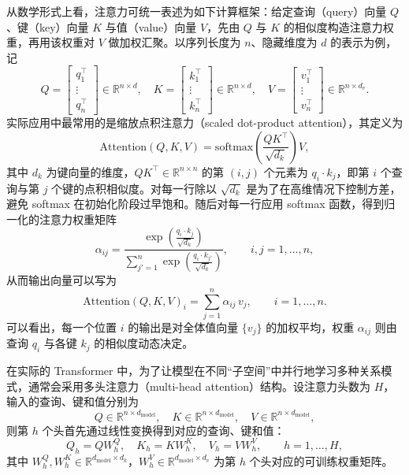 从数学形式上看，注意力可统一表述为如下计算框架：给定查询（query）向量 $Q$、键（key）向量 $K$ 与值（value）向量 $V$，先由 $Q$ 与 $K$ 的相似度构造注意力权重，再用该权重对 $V$ 做加权汇聚。以序列长度为 $n$、隐藏维度为 $d$ 的表示为例，记
\[
    Q = \begin{bmatrix} q_1^\top \\ \vdots \\ q_n^\top \end{bmatrix} \in \mathbb{R}^{n \times d},\quad
    K = \begin{bmatrix} k_1^\top \\ \vdots \\ k_n^\top \end{bmatrix} \in \mathbb{R}^{n \times d},\quad
    V = \begin{bmatrix} v_1^\top \\ \vdots \\ v_n^\top \end{bmatrix} \in \mathbb{R}^{n \times d_v}.
\]
实际应用中最常用的是缩放点积注意力（scaled dot-product attention），其定义为
\begin{equation}
    \mathrm{Attention}(Q,K,V)
    = \mathrm{softmax}\!\left( \frac{QK^\top}{\sqrt{d_k}} \right) V,
\end{equation}
其中 $d_k$ 为键向量的维度，$QK^\top \in \mathbb{R}^{n \times n}$ 的第 $(i,j)$ 个元素为 $q_i \cdot k_j$，即第 $i$ 个查询与第 $j$ 个键的点积相似度。对每一行除以 $\sqrt{d_k}$ 是为了在高维情况下控制方差，避免 softmax 在初始化阶段过早饱和。随后对每一行应用 softmax 函数，得到归一化的注意力权重矩阵
\begin{equation}
    \alpha_{ij}
    = \frac{
        \exp\!\left( \frac{q_i \cdot k_j}{\sqrt{d_k}} \right)
    }{
        \sum_{j'=1}^{n} \exp\!\left( \frac{q_i \cdot k_{j'}}{\sqrt{d_k}} \right)
    },
    \qquad i,j = 1,\dots,n,
\end{equation}
从而输出向量可以写为
\begin{equation}
    \mathrm{Attention}(Q,K,V)_i
    = \sum_{j=1}^{n} \alpha_{ij} \, v_j,
    \qquad i = 1,\dots,n.
\end{equation}
可以看出，每一个位置 $i$ 的输出是对全体值向量 $\{v_j\}$ 的加权平均，权重 $\alpha_{ij}$ 则由查询 $q_i$ 与各键 $k_j$ 的相似度动态决定。

在实际的 Transformer 中，为了让模型在不同“子空间”中并行地学习多种关系模式，通常会采用多头注意力（multi-head attention）结构。设注意力头数为 $H$，输入的查询、键和值分别为
\[
    Q \in \mathbb{R}^{n \times d_{\mathrm{model}}},\quad
    K \in \mathbb{R}^{n \times d_{\mathrm{model}}},\quad
    V \in \mathbb{R}^{n \times d_{\mathrm{model}}},
\]
则第 $h$ 个头首先通过线性变换得到对应的查询、键和值：
\begin{equation}
    Q_h = Q W_h^Q,\quad
    K_h = K W_h^K,\quad
    V_h = V W_h^V,\qquad h = 1,\dots,H,
\end{equation}
其中 $W_h^Q, W_h^K \in \mathbb{R}^{d_{\mathrm{model}} \times d_k}$，$W_h^V \in \mathbb{R}^{d_{\mathrm{model}} \times d_v}$ 为第 $h$ 个头对应的可训练权重矩阵。

